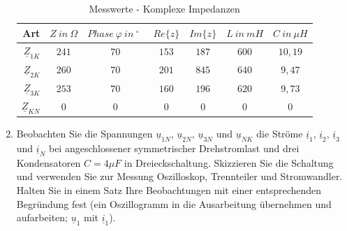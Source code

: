 \begin{enumerate}[label=\alph*)]
	 		\begin{center}
	 			\begin{table}[h]
	 				\begin{tabular}{r c c c c c c}
	 					\hline
	 					Art & \( Z\ in\ \Omega\) & \( Phase\ \varphi\ in\ ^\circ\ \ \)  & \( Re{\{z\}} \) & \( Im{\{z\}} \) & \( L\ in\ mH \) & \( C\ in\ \mu H \) \\
	 					\hline
	 					$\underline{Z}_{1K}$ & \( 241 \) & \( 70 \)	& \( 153 \) & \( 187 \) & \( 600 \)	& \( 10,19 \)\\
	 					$\underline{Z}_{2K}$ & \( 260 \) & \( 70 \)	& \( 201 \) & \( 845 \) & \( 640 \)	& \( 9,47 \)\\
	 					$\underline{Z}_{3K}$ & \( 253 \) & \( 70 \)	& \( 160 \) & \( 196 \) & \( 620 \)	& \( 9,73 \)\\
	 					$\underline{Z}_{KN}$ & \( 0   \) & \( 0 \)	& \( 0   \) & \( 0 \)	& \( 0 \)	& \( 0 \)\\
	 					\hline
	 				\end{tabular}
	 				\caption{Messwerte - Komplexe Impedanzen}
	 			\end{table}
	 		\end{center}
	 		
	 		
	 		
	 		\item Beobachten Sie die Spannungen $\underline{u}_{1N}$, $\underline{u}_{2N}$, $\underline{u}_{3N}$ und $\underline{u}_{NK}$ die Ströme $\underline{i}_{1}$, $\underline{i}_{2}$, $\underline{i}_{3}$ und $\underline{i}_{N}$ bei angeschlossener symmetrischer Drehstromlast und drei Kondensatoren $C = 4 \mu F$ in Dreieckschaltung.  Skizzieren Sie die Schaltung und verwenden Sie zur Messung Oszilloskop, Trennteiler und Stromwandler. Halten Sie in einem Satz Ihre Beobachtungen mit einer entsprechenden Begründung fest (ein Oszillogramm in die Ausarbeitung übernehmen und aufarbeiten; $\underline{u}_{1}$ mit $\underline{i}_{1}$).
	 		

\end{enumerate}
